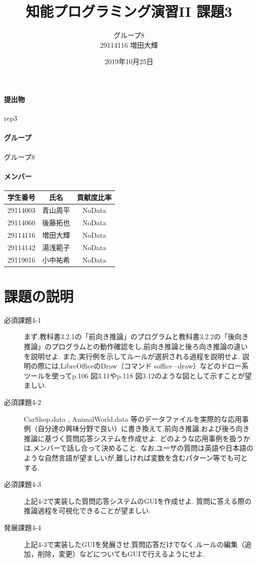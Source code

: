 \documentclass[uplatex,12pt]{jsarticle}
\title{知能プログラミング演習II 課題3}
\author{グループ8\\
  29114116 増田大輝\\
}
\date{2019年10月25日}
\begin{document}
\maketitle

\paragraph{提出物} rep3
\paragraph{グループ} グループ8

\paragraph{メンバー}
\begin{tabular}{|c|c|c|}
  \hline
  学生番号&氏名&貢献度比率\\
  \hline\hline
  29114003&青山周平&NoData\\
  \hline
  29114060&後藤拓也&NoData\\
  \hline
  29114116&増田大輝&NoData\\
  \hline
  29114142&湯浅範子&NoData\\
  \hline
  29119016&小中祐希&NoData\\
  \hline
\end{tabular}



\section{課題の説明}
\begin{description}
\item[必須課題4-1] まず,教科書3.2.1の「前向き推論」のプログラムと教科書3.2.2の「後向き推論」のプログラムとの動作確認をし,前向き推論と後ろ向き推論の違いを説明せよ.
また,実行例を示してルールが選択される過程を説明せよ.
説明の際には,LibreOfficeのDraw（コマンド soffice --draw）などのドロー系ツールを使ってp.106 図3.11やp.118 図3.12のような図として示すことが望ましい.
\item[必須課題4-2] CarShop.data , AnimalWorld.data 等のデータファイルを実際的な応用事例（自分達の興味分野で良い）に書き換えて,前向き推論,および後ろ向き推論に基づく質問応答システムを作成せよ.
どのような応用事例を扱うかは,メンバーで話し合って決めること.
なお,ユーザの質問は英語や日本語のような自然言語が望ましいが,難しければ変数を含むパターン等でも可とする.
\item[必須課題4-3] 上記4-2で実装した質問応答システムのGUIを作成せよ.
質問に答える際の推論過程を可視化できることが望ましい.
\item[発展課題4-4] 上記4-3で実装したGUIを発展させ,質問応答だけでなく,ルールの編集（追加，削除，変更）などについてもGUIで行えるようにせよ.
\end{description}
\end{document}
